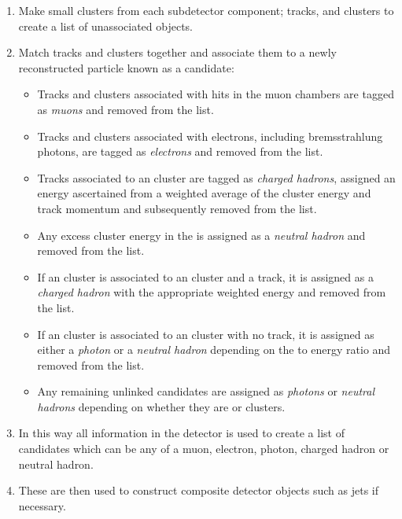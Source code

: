 \begin{enumerate}
  \item{Make small clusters from each subdetector component; tracks, \ECAL and \HCAL clusters to create a list of unassociated objects.}
  \item{Match tracks and clusters together and associate them to a newly reconstructed particle known as a \PF candidate:}
  \begin{itemize}
    \item{Tracks and clusters associated with hits in the muon chambers are tagged as \emph{muons} and removed from the list.}
    \item{Tracks and clusters associated with electrons, including bremsstrahlung photons, are tagged as \emph{electrons} and removed from the list.}
    \item{Tracks associated to an \HCAL cluster are tagged as \emph{charged hadrons}, assigned an energy ascertained from a weighted average of the cluster energy and track momentum and subsequently removed from the list.}
    \item{Any excess cluster energy in the \HCAL is assigned as a \emph{neutral hadron} and removed from the list.}
    \item{If an \ECAL cluster is associated to an \HCAL cluster and a track, it is assigned as a \emph{charged hadron} with the appropriate weighted energy and removed from the list.}
    \item{If an \ECAL cluster is associated to an \HCAL cluster with no track, it is assigned as either a \emph{photon} or a \emph{neutral hadron} depending on the \HCAL to \ECAL energy ratio and removed from the list.}
    \item{Any remaining unlinked candidates are assigned as \emph{photons} or \emph{neutral hadrons} depending on whether they are \ECAL or \HCAL clusters.}
  \end{itemize}
  \item{In this way all information in the detector is used to create a list of candidates which can be any of a muon, electron, photon, charged hadron or neutral hadron.}
  \item{These are then used to construct composite detector objects such as jets if necessary.}
\end{enumerate}

